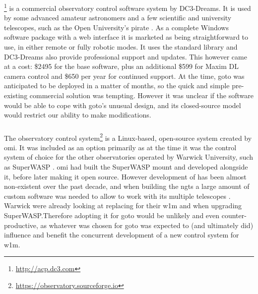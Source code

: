 \begin{colsection}
\begin{colsection}
\subsubsection{}
\footnote{\url{http://acp.dc3.com}} is a commercial observatory control software system by DC3-Dreams. It is used by some advanced amateur astronomers and a few scientific and university telescopes, such as the Open University's \gls{pirate} \citep{PIRATE}. As a complete Windows software package with a web interface it is marketed as being straightforward to use, in either remote or fully robotic modes. It uses the  standard library and DC3-Dreams also provide professional support and updates. This however came at a cost: \$2495 for the base software, plus an additional \$599 for Maxim DL camera control and \$650 per year for continued support. At the time, \gls{goto} was anticipated to be deployed in a matter of months, so the quick and simple pre-existing commercial solution was tempting. However it was unclear if the  software would be able to cope with \gls{goto}'s unusual design, and its closed-source model would restrict our ability to make modifications.

\subsubsection{}

The  observatory control system\footnote{\url{https://observatory.sourceforge.io}} is a Linux-based, open-source system created by \gls{omi}. It was included as an option primarily as at the time it was the control system of choice for the other observatories operated by Warwick University, such as SuperWASP \citep{SuperWASP}. \gls{omi} had built the SuperWASP mount and developed  alongside it, before later making it open source. However development of  has been almost non-existent over the past decade, and when building the \gls{ngts} a large amount of custom software was needed to allow  to work with its multiple telescopes \citep{ngts}. Warwick were already looking at replacing  for their \gls{w1m} and when upgrading SuperWASP.\@ Therefore adopting it for \gls{goto} would be unlikely and even counter-productive, as whatever was chosen for \gls{goto} was expected to (and ultimately did) influence and benefit the concurrent development of a new control system for \gls{w1m}.


\end{colsection}
\end{colsection}
